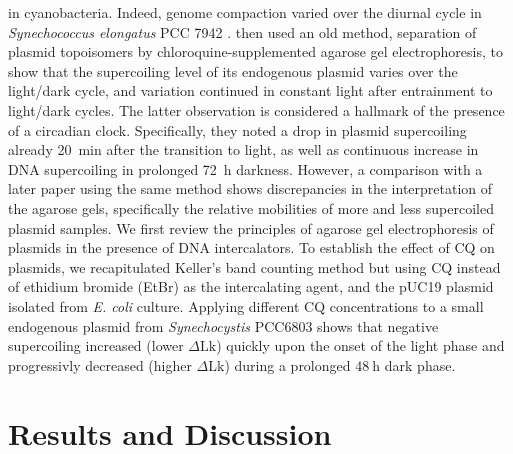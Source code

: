 \documentclass[10pt,a4]{article}
\def\cite#1{\hypersetup{citecolor=Teal}\citep{#1}} %
\newcommand{\scyst}{\textit{Synechocystis} PCC6803}
\newcommand{\dlk}{\ensuremath{\Delta\text{Lk}}}
\begin{document}
in cyanobacteria. Indeed, genome compaction varied
over the diurnal cycle in \textit{Synechococcus elongatus} PCC 7942
\cite{Smith2006}. \citet{Woelfle2007} then used an old
method, separation of plasmid topoisomers by chloroquine-supplemented
agarose gel electrophoresis, to show that the supercoiling level of
its endogenous plasmid varies over the light/dark cycle, and variation
continued in constant light after entrainment to light/dark
cycles. The latter observation is considered a hallmark of the
presence of a circadian clock.  Specifically, they noted a drop in
plasmid supercoiling already \SI{20}{\minute} after the transition to
light, as well as continuous increase in DNA supercoiling in prolonged
\SI{72}{\hour} darkness. However, a comparison with a later paper
using the same method \cite{Vijayan2009} shows discrepancies in the
interpretation of the agarose gels, specifically the relative
mobilities of more and less supercoiled plasmid samples.
%
We first review the principles of agarose gel electrophoresis of
plasmids in the presence of DNA intercalators.  To establish the
effect of CQ on plasmids, we recapitulated Keller's band counting
method but using CQ instead of ethidium bromide (EtBr) as the
intercalating agent, and the pUC19 plasmid isolated from
\textit{E. coli} culture. Applying different CQ concentrations to a
small endogenous plasmid from \scyst{} shows that negative
supercoiling increased (lower $\dlk$) quickly upon the onset of the
light phase and progressivly decreased (higher $\dlk$) during a
prolonged $\SI{48}{\hour}$ dark phase.



\section{Results and Discussion}
\end{document}
